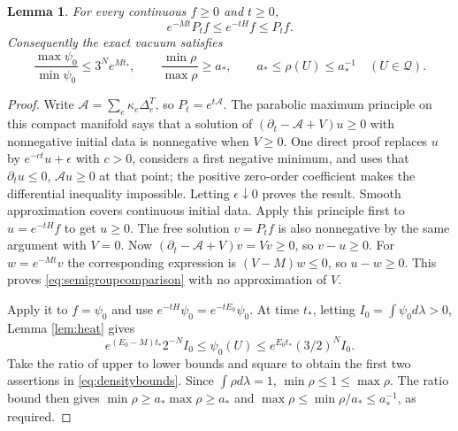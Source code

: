 \documentclass[11pt]{article}
\newtheorem{lemma}[theorem]{Lemma}
\theoremstyle{definition}
\begin{document}
\begin{lemma}\label{lem:comparison}
For every continuous $f\geq0$ and $t\geq0$,
\begin{equation}\label{eq:semigroupcomparison}
 e^{-Mt}P_tf\leq e^{-tH}f\leq P_tf.
\end{equation}
Consequently the exact vacuum satisfies
\begin{equation}\label{eq:densitybounds}
 \frac{\max\psi_0}{\min\psi_0}\leq3^Ne^{Mt_*},\qquad
 \frac{\min\rho}{\max\rho}\geq a_*,\qquad
 a_*\leq\rho(U)\leq a_*^{-1}\quad(U\in\mathcal Q).
\end{equation}
\end{lemma}
\begin{proof}
Write $\mathcal A=\sum_e\kappa_e\Delta_e^T$, so
$P_t=e^{t\mathcal A}$. The parabolic maximum principle on this compact
manifold says that a solution of
$(\partial_t-\mathcal A+V)u\geq0$ with nonnegative initial data is
nonnegative when $V\geq0$. One direct proof replaces $u$ by
$e^{-ct}u+\epsilon$ with $c>0$, considers a first negative minimum,
and uses that $\partial_tu\leq0$, $\mathcal Au\geq0$ at that point;
the positive zero-order coefficient makes the differential inequality
impossible. Letting $\epsilon\downarrow0$ proves the result. Smooth
approximation covers continuous initial data.
Apply this principle first to $u=e^{-tH}f$ to get $u\geq0$.
The free solution $v=P_tf$ is also nonnegative by the same argument
with $V=0$. Now
$(\partial_t-\mathcal A+V)v=Vv\geq0$, so $v-u\geq0$.
For $w=e^{-Mt}v$ the corresponding expression is
$(V-M)w\leq0$, so $u-w\geq0$. This proves
\eqref{eq:semigroupcomparison} with no approximation of $V$.

Apply it to $f=\psi_0$ and use
$e^{-tH}\psi_0=e^{-tE_0}\psi_0$. At time $t_*$, letting
$I_0=\int\psi_0d\lambda>0$, Lemma \ref{lem:heat} gives
\[
 e^{(E_0-M)t_*}2^{-N}I_0
 \leq\psi_0(U)\leq e^{E_0t_*}(3/2)^NI_0.
\]
Take the ratio of upper to lower bounds and square to obtain the first
two assertions in \eqref{eq:densitybounds}. Since $\int\rho d\lambda=1$,
$\min\rho\leq1\leq\max\rho$. The ratio bound then gives
$\min\rho\geq a_*\max\rho\geq a_*$ and
$\max\rho\leq\min\rho/a_*\leq a_*^{-1}$, as required.
\end{proof}
\end{document}

